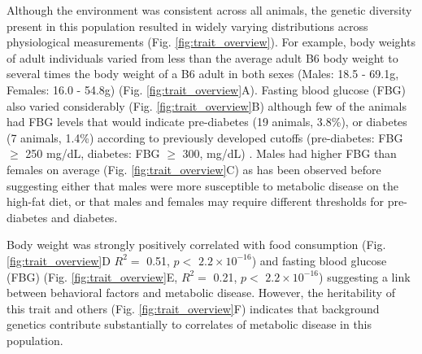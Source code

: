 \documentclass[
]{article}
\begin{document}
Although the environment was consistent across all animals, the genetic
diversity present in this population resulted in widely varying
distributions across physiological measurements (Fig.
\ref{fig:trait_overview}). For example, body weights of adult
individuals varied from less than the average adult B6 body weight to
several times the body weight of a B6 adult in both sexes (Males: 18.5 -
69.1g, Females: 16.0 - 54.8g) (Fig. \ref{fig:trait_overview}A). Fasting
blood glucose (FBG) also varied considerably (Fig.
\ref{fig:trait_overview}B) although few of the animals had FBG levels
that would indicate pre-diabetes (19 animals, 3.8\%), or diabetes (7
animals, 1.4\%) according to previously developed cutoffs (pre-diabetes:
FBG \(\geq\) 250 mg/dL, diabetes: FBG \(\geq\) 300, mg/dL)
\cite{pmid17018838}. Males had higher FBG than females on average (Fig.
\ref{fig:trait_overview}C) as has been observed before suggesting either
that males were more susceptible to metabolic disease on the high-fat
diet, or that males and females may require different thresholds for
pre-diabetes and diabetes.

Body weight was strongly positively correlated with food consumption
(Fig. \ref{fig:trait_overview}D \(R^2 =\) 0.51, \(p<\)
\ensuremath{2.2\times 10^{-16}}) and fasting blood glucose (FBG) (Fig.
\ref{fig:trait_overview}E, \(R^2=\) 0.21, \(p <\)
\ensuremath{2.2\times 10^{-16}}) suggesting a link between behavioral
factors and metabolic disease. However, the heritability of this trait
and others (Fig. \ref{fig:trait_overview}F) indicates that background
genetics contribute substantially to correlates of metabolic disease in
this population.
\end{document}

